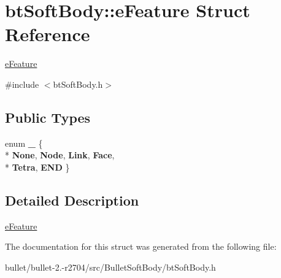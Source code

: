 \hypertarget{structbt_soft_body_1_1e_feature}{\section{bt\+Soft\+Body\+:\+:e\+Feature Struct Reference}
\label{structbt_soft_body_1_1e_feature}
}


\hyperlink{structbt_soft_body_1_1e_feature}{e\+Feature}  




{\ttfamily \#include $<$bt\+Soft\+Body.\+h$>$}

\subsection*{Public Types}
\begin{DoxyCompactItemize}
\item 
\hypertarget{structbt_soft_body_1_1e_feature_a51ea05112f741010b57b8deadf135f7a}{enum {\bfseries \+\_\+} \{ \\*
{\bfseries None}, 
{\bfseries Node}, 
{\bfseries Link}, 
{\bfseries Face}, 
\\*
{\bfseries Tetra}, 
{\bfseries E\+N\+D}
 \}}\label{structbt_soft_body_1_1e_feature_a51ea05112f741010b57b8deadf135f7a}

\end{DoxyCompactItemize}


\subsection{Detailed Description}
\hyperlink{structbt_soft_body_1_1e_feature}{e\+Feature} 

The documentation for this struct was generated from the following file\+:\begin{DoxyCompactItemize}
\item 
bullet/bullet-\/2.-\/r2704/src/\+Bullet\+Soft\+Body/bt\+Soft\+Body.\+h\end{DoxyCompactItemize}
